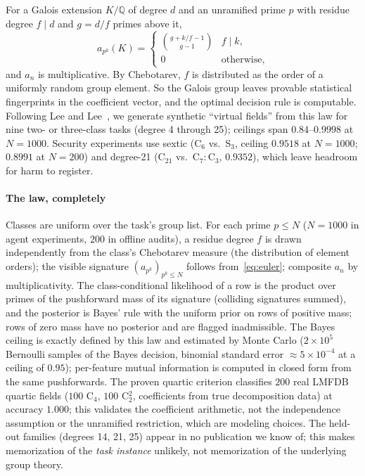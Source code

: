 \documentclass[conference]{IEEEtran}
\newcommand{\Q}{\mathbb{Q}}
\begin{document}
For a Galois extension $K/\Q$ of degree $d$ and an unramified prime
$p$ with residue degree $f\mid d$ and $g=d/f$ primes above it,
\begin{equation}
a_{p^k}(K)=\begin{cases}\binom{g+k/f-1}{g-1}& f\mid k,\\ 0&\text{otherwise,}\end{cases}
\label{eq:euler}
\end{equation}
and $a_n$ is multiplicative. By Chebotarev, $f$ is distributed as the
order of a uniformly random group element. So the Galois group leaves
provable statistical fingerprints in the coefficient vector, and the
optimal decision rule is computable. Following Lee and
Lee~\cite{leelee2025}, we generate synthetic ``virtual fields'' from
this law for nine two- or three-class tasks (degree 4 through 25);
ceilings span $0.84$--$0.9998$ at $N{=}1000$. Security experiments use
sextic (C$_6$ vs.\ S$_3$, ceiling $0.9518$ at $N{=}1000$; $0.8991$ at
$N{=}200$) and degree-21 (C$_{21}$ vs.\ C$_7{:}$C$_3$, $0.9352$), which
leave headroom for harm to register.

\paragraph{The law, completely} Classes are uniform over the task's
group list. For each prime $p\le N$ ($N{=}1000$ in agent experiments,
$200$ in offline audits), a residue degree $f$ is drawn independently
from the class's Chebotarev measure (the distribution of element
orders); the visible signature $(a_{p^k})_{p^k\le N}$ follows
from~\eqref{eq:euler}; composite $a_n$ by multiplicativity. The
class-conditional likelihood of a row is the product over primes of
the pushforward mass of its signature (colliding signatures summed),
and the posterior is Bayes' rule with the uniform prior on rows of
positive mass; rows of zero mass have no posterior and are flagged
inadmissible. The Bayes ceiling is exactly defined by this law and
estimated by Monte Carlo ($2\times10^5$ Bernoulli samples of the Bayes
decision, binomial standard error $\approx5\times10^{-4}$ at a ceiling
of $0.95$); per-feature mutual information is computed in closed
form from the same pushforwards. The proven quartic criterion
classifies $200$ real LMFDB quartic fields ($100$ C$_4$, $100$
C$_2^2$, coefficients from true decomposition data) at accuracy
$1.000$; this validates the coefficient arithmetic, not the
independence assumption or the unramified restriction, which are
modeling choices. The held-out families (degrees 14, 21, 25) appear in
no publication we know of; this makes memorization of the \emph{task
instance} unlikely, not memorization of the underlying group theory.
\end{document}
